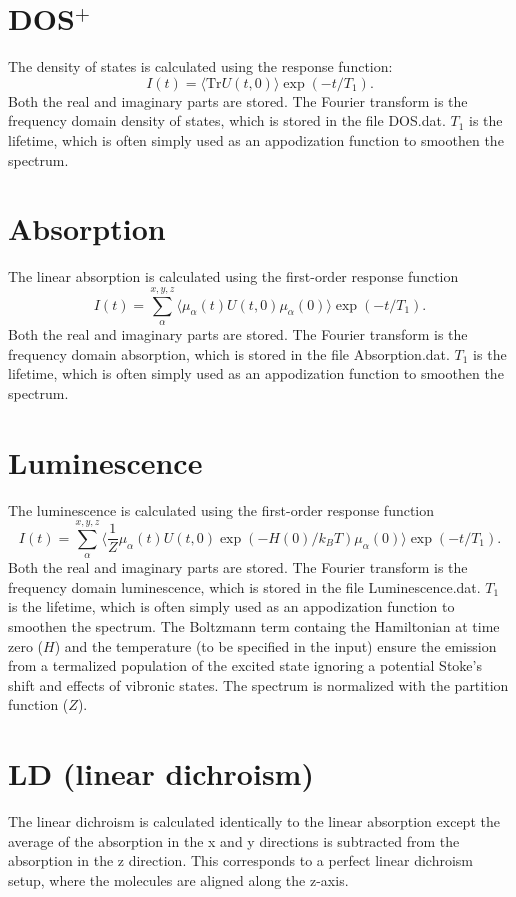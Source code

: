\section{DOS$^{+}$}
The density of states is calculated using the response function:
\begin{equation}
	I(t)=\langle\textrm{Tr}U(t,0)\rangle\exp(-t/T_1).
\end{equation}
Both the real and imaginary parts are stored. The Fourier transform is the frequency domain density of states, which is stored in the file DOS.dat. $T_1$ is the lifetime, which is often simply used as an appodization function to smoothen the spectrum.
\section{Absorption}
The linear absorption is calculated using the first-order response function \cite{Duan_2015}
\begin{equation}
	I(t)=\sum_{\alpha}^{x,y,z}\langle\mu_{\alpha}(t)U(t,0)\mu_{\alpha}(0)\rangle\exp(-t/T_1).
\end{equation}
Both the real and imaginary parts are stored. The Fourier transform is the frequency domain absorption, which is stored in the file Absorption.dat. $T_1$ is the lifetime, which is often simply used as an appodization function to smoothen the spectrum. 
\section{Luminescence}
The luminescence is calculated using the first-order response function
\begin{equation}
	I(t)=\sum_{\alpha}^{x,y,z}\langle\frac{1}{Z}\mu_{\alpha}(t)U(t,0)\exp(-H(0)/k_BT)\mu_{\alpha}(0)\rangle\exp(-t/T_1).
\end{equation}
Both the real and imaginary parts are stored. The Fourier transform is the frequency domain luminescence, which is stored in the file Luminescence.dat. $T_1$ is the lifetime, which is often simply used as an appodization function to smoothen the spectrum. The Boltzmann term containg the Hamiltonian at time zero ($H$) and the temperature (to be specified in the input) ensure the emission from a termalized population of the excited state ignoring a potential Stoke's shift and effects of vibronic states. The spectrum is normalized with the partition function ($Z$). 
\section{LD (linear dichroism)}
The linear dichroism is calculated identically to the linear absorption except the average of the absorption in the x and y directions is subtracted from the absorption in the z direction. This corresponds to a perfect linear dichroism setup, where the molecules are aligned along the z-axis.
